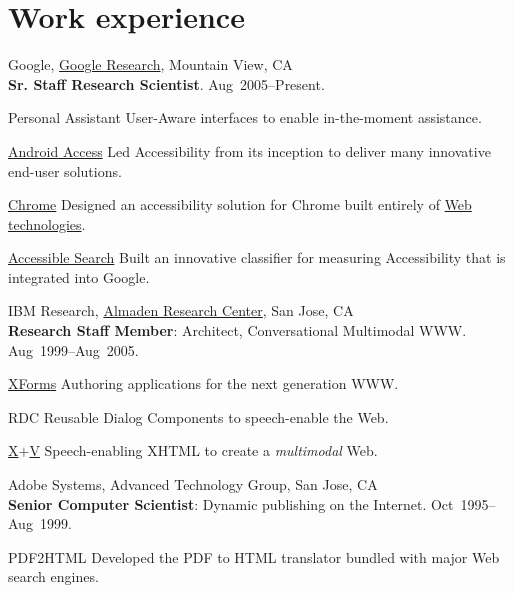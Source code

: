 \documentclass{article}
\begin{document}
\section*{Work experience}
\begin{compactitem}
  \item {Google},
  \href{http://www.google.com/search?q=\%22tv+raman\%22}{Google Research}, Mountain View, CA\\
  \textbf{Sr. Staff Research Scientist}.
\hfill Aug~2005--Present.
\begin{compactdesc}
  \item [Personal Assistant] User-Aware interfaces to enable
in-the-moment  assistance.
\item[\href{http://eyes-free.blogspot.com}{Android Access}]  Led  Accessibility from its
inception to deliver many innovative end-user solutions.
\item[\href{http://chromevox.blogspot.com}{Chrome}]
  Designed   an   accessibility
solution for Chrome  built entirely of 
\href{http://videosrv14.cs.washington.edu/info/audio/mp3/colloq/TRaman_071004.mp3}{Web technologies}.
\item[\href{https://www.youtube.com/watch?v=SIDJnLiizio}{Accessible Search}] Built an innovative classifier for
  measuring  Accessibility  that is integrated into Google.
\end{compactdesc}

\item {IBM Research},
\href{http://www.google.com/search?q=tv+raman+IBM+Almaden}{Almaden Research Center}, San Jose, CA\\
  \textbf{Research Staff Member}: Architect, Conversational
  Multimodal WWW\@. \hfill Aug~1999--Aug~2005.
\begin{compactdesc}
\item [\href{http://www.amazon.com/XForms-XML-Powered-Web-Forms/dp/0321154991}{XForms}] Authoring applications for the next generation
  WWW.\@
\item [RDC] Reusable Dialog Components to speech-enable the Web.

\item [\href{http://www.w3.org/tr/xml-events}{X$+$V}] Speech-enabling XHTML to create a \emph{multimodal\/}
  Web.
\end{compactdesc}
\item   {Adobe Systems},  {Advanced Technology Group}, San Jose, CA\\
  \textbf{Senior Computer Scientist}: Dynamic publishing on the
  Internet.  \hfill Oct~1995--Aug~1999.
\begin{compactdesc}
\item[PDF2HTML] Developed the PDF to HTML translator bundled with
  major Web search engines.
  

\end{compactdesc}
\end{compactitem}
\end{document}
